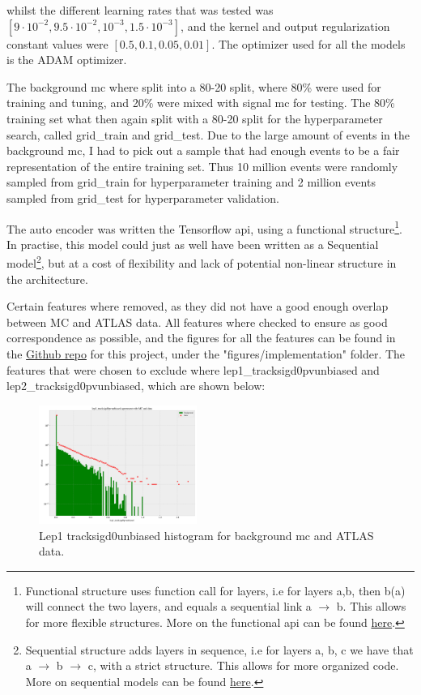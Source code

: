 \documentclass[ reprint, amsmath,amssymb, aps, nofootinbib]{revtex4-2}
\begin{document}
whilst the different learning rates that was tested was $[9\cdot 10^{-2}, 9.5\cdot 10^{-2}, 10^{-3}, 1.5\cdot 10^{-3}]$, and the kernel and output regularization constant values were $[0.5, 0.1, 0.05, 0.01]$. The optimizer used for all the models is the ADAM\cite{https://doi.org/10.48550/arxiv.1412.6980} optimizer. \par \par 
The background mc where split into a 80-20 split, where 80\% were used for training and tuning, and 20\% were mixed with signal mc for testing. The 80\% training set what then again split with a 80-20 split for the hyperparameter search, called grid\_train and grid\_test. Due to the large amount of events in the background mc, I had to pick out a sample that had enough events to be a fair representation of the entire training set. Thus 10 million events were randomly sampled from grid\_train for hyperparameter training and 2 million events sampled from grid\_test for hyperparameter validation. \par 
The auto encoder was written the Tensorflow api\cite{tensorflow2015-whitepaper}\cite{chollet2015keras}, using a functional structure\footnote{Functional structure uses function call for layers, i.e for layers a,b, then b(a) will connect the two layers, and equals a sequential link a $\to$ b. This allows for more flexible structures. More on the functional api can be found \href{https://www.tensorflow.org/guide/keras/functional}{here}.}. In practise, this model could just as well have been written as a Sequential model\footnote{Sequential structure adds layers in sequence, i.e for layers a, b, c we have that a $\to$ b $\to$ c, with a strict structure. This allows for more organized code. More on sequential models can be found \href{https://www.tensorflow.org/guide/keras/sequential_model}{here}.}, but at a cost of flexibility and lack of potential non-linear structure in the architecture. \par 
Certain features where removed, as they did not have a good enough overlap between MC and ATLAS data. All features where checked to ensure as good correspondence as possible, and the figures for all the features can be found in the \href{https://github.com/Gadangadang/FYS5555/tree/main/Project3}{Github repo} for this project, under the "figures/implementation" folder. The features that were chosen to exclude where lep1\_tracksigd0pvunbiased and lep2\_tracksigd0pvunbiased, which are shown below:

\begin{figure}[H]
    \centering
    \includegraphics[width=0.46\textwidth]{figures/implementation/lep1_tracksigd0pvunbiased.pdf}
    \caption{Lep1 tracksigd0unbiased histogram for background mc and ATLAS data. }
    \label{fig:lep1sigd0}
\end{figure}
\end{document}
